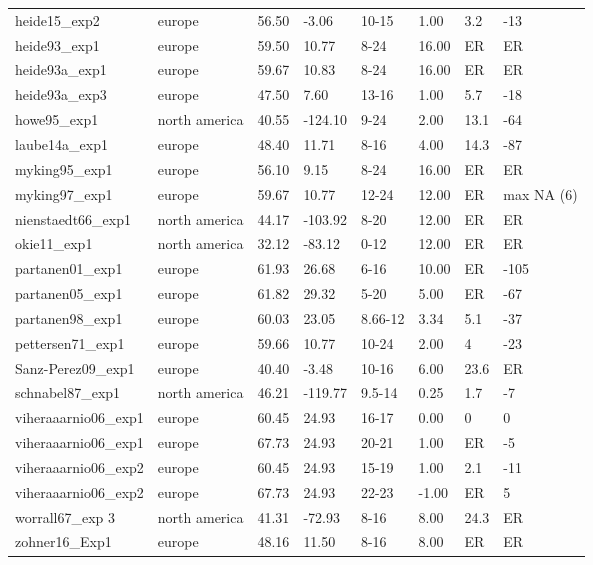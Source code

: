 \documentclass{article}
\begin{document}
\begin{table}[ht]
\begin{tabular}{|p{}|p{}|p{}|p{}|p{}|p{}|p{}|p{}|}
  heide15\_exp2 & europe & 56.50 & -3.06 & 10-15 & 1.00 & 3.2 & -13 \\ 
  heide93\_exp1 & europe & 59.50 & 10.77 & 8-24 & 16.00 & ER & ER \\ 
  heide93a\_exp1 & europe & 59.67 & 10.83 & 8-24 & 16.00 & ER & ER \\ 
  heide93a\_exp3 & europe & 47.50 & 7.60 & 13-16 & 1.00 & 5.7 & -18 \\ 
  howe95\_exp1 & north america & 40.55 & -124.10 & 9-24 & 2.00 & 13.1 & -64 \\ 
  laube14a\_exp1 & europe & 48.40 & 11.71 & 8-16 & 4.00 & 14.3 & -87 \\ 
  myking95\_exp1 & europe & 56.10 & 9.15 & 8-24 & 16.00 & ER & ER \\ 
  myking97\_exp1 & europe & 59.67 & 10.77 & 12-24 & 12.00 & ER & max NA (6) \\ 
  nienstaedt66\_exp1 & north america & 44.17 & -103.92 & 8-20 & 12.00 & ER & ER \\ 
  okie11\_exp1 & north america & 32.12 & -83.12 & 0-12 & 12.00 & ER & ER \\ 
  partanen01\_exp1 & europe & 61.93 & 26.68 & 6-16 & 10.00 & ER & -105 \\ 
  partanen05\_exp1 & europe & 61.82 & 29.32 & 5-20 & 5.00 & ER & -67 \\ 
  partanen98\_exp1 & europe & 60.03 & 23.05 & 8.66-12 & 3.34 & 5.1 & -37 \\ 
  pettersen71\_exp1 & europe & 59.66 & 10.77 & 10-24 & 2.00 & 4 & -23 \\ 
  Sanz-Perez09\_exp1 & europe & 40.40 & -3.48 & 10-16 & 6.00 & 23.6 & ER \\ 
  schnabel87\_exp1 & north america & 46.21 & -119.77 & 9.5-14 & 0.25 & 1.7 & -7 \\ 
  viheraaarnio06\_exp1 & europe & 60.45 & 24.93 & 16-17 & 0.00 & 0 & 0 \\ 
  viheraaarnio06\_exp1 & europe & 67.73 & 24.93 & 20-21 & 1.00 & ER & -5 \\ 
  viheraaarnio06\_exp2 & europe & 60.45 & 24.93 & 15-19 & 1.00 & 2.1 & -11 \\ 
  viheraaarnio06\_exp2 & europe & 67.73 & 24.93 & 22-23 & -1.00 & ER & 5 \\ 
  worrall67\_exp 3 & north america & 41.31 & -72.93 & 8-16 & 8.00 & 24.3 & ER \\ 
  zohner16\_Exp1 & europe & 48.16 & 11.50 & 8-16 & 8.00 & ER & ER \\ 
   \hline
\end{tabular}
\end{table}\clearpage
\end{document}
